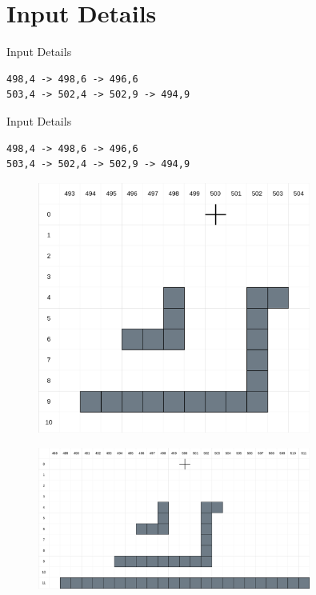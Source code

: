 \documentclass{beamer}
\begin{document}
\section{Input Details}

\begin{frame}[fragile]{Input Details}
    \begin{verbatim}
498,4 -> 498,6 -> 496,6
503,4 -> 502,4 -> 502,9 -> 494,9
    \end{verbatim}
\end{frame}
\begin{frame}[fragile]{Input Details}
    \begin{verbatim}
498,4 -> 498,6 -> 496,6
503,4 -> 502,4 -> 502,9 -> 494,9
    \end{verbatim}
    \begin{minipage}[c]{0.4\textwidth}
        \begin{figure}[H]
            \centering
            \includegraphics[width=0.8\textwidth]{Images/AoC22_14_00_grid.png}
        \end{figure}
    \end{minipage}%
    \begin{minipage}[c]{0.6\textwidth}
        \begin{figure}[H]
            \centering
            \includegraphics[width=0.8\textwidth]{Images/AoC22_14_Part_2_0_grid.png}
        \end{figure}
    \end{minipage}
\end{frame}
\end{document}
